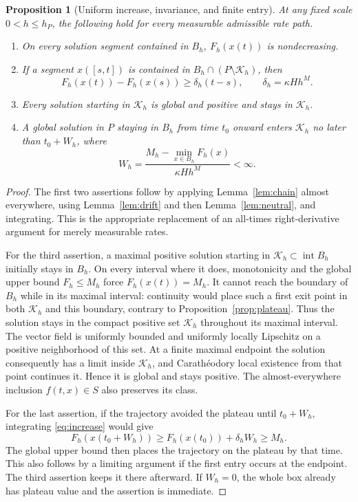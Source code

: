 \documentclass[11pt]{article}
\newtheorem{proposition}[theorem]{Proposition}
\theoremstyle{definition}
\theoremstyle{remark}
\newcommand{\intr}{\operatorname{int}}
\numberwithin{equation}{section}
\begin{document}
\begin{proposition}[Uniform increase, invariance, and finite entry]
\label{prop:entry}
At any fixed scale $0<h\leq h_P$, the following hold for every
measurable admissible rate path.
\begin{enumerate}
\item On every solution segment contained in $B_h$, $F_h(x(t))$
is nondecreasing.
\item If a segment $x([s,t])$ is contained in
$B_h\cap(P\setminus\mathcal K_h)$, then
\begin{equation}
 F_h(x(t))-F_h(x(s))\geq\delta_h(t-s),
 \qquad \delta_h=\kappa Hh^M.
 \label{eq:increase}
\end{equation}
\item Every solution starting in $\mathcal K_h$ is global and
positive and stays in $\mathcal K_h$.
\item A global solution in $P$ staying in $B_h$ from time $t_0$
onward enters $\mathcal K_h$ no later than $t_0+W_h$, where
\begin{equation}
 W_h=\frac{M_h-\min_{x\in B_h}F_h(x)}{\kappa Hh^M}<\infty.
 \label{eq:Wh}
\end{equation}
\end{enumerate}
\end{proposition}
\begin{proof}
The first two assertions follow by applying
Lemma~\ref{lem:chain} almost everywhere, using
Lemma~\ref{lem:drift} and then Lemma~\ref{lem:neutral}, and
integrating. This is the appropriate replacement of an
all-times right-derivative argument for merely measurable rates.

For the third assertion, a maximal positive solution starting
in $\mathcal K_h\subset\intr B_h$ initially stays in $B_h$.
On every interval where it does, monotonicity and the global
upper bound $F_h\leq M_h$ force $F_h(x(t))=M_h$.
It cannot reach the boundary of $B_h$ while in its maximal
interval: continuity would place such a first exit point in
both $\mathcal K_h$ and this boundary, contrary to
Proposition~\ref{prop:plateau}. Thus the solution stays in the
compact positive set $\mathcal K_h$ throughout its maximal
interval. The vector field is uniformly bounded and uniformly
locally Lipschitz on a positive neighborhood of this set. At a
finite maximal endpoint the solution consequently has a limit
inside $\mathcal K_h$, and Carath\'eodory local existence from
that point continues it. Hence it is global and stays positive.
The almost-everywhere inclusion $f(t,x)\in S$ also preserves
its class.

For the last assertion, if the trajectory avoided the plateau
until $t_0+W_h$, integrating \eqref{eq:increase} would give
\[
 F_h(x(t_0+W_h))\geq F_h(x(t_0))+\delta_h W_h\geq M_h.
\]
The global upper bound then places the trajectory on the
plateau by that time. This also follows by a limiting argument
if the first entry occurs at the endpoint. The third assertion
keeps it there afterward. If $W_h=0$, the whole box already
has plateau value and the assertion is immediate.
\end{proof}
\end{document}
